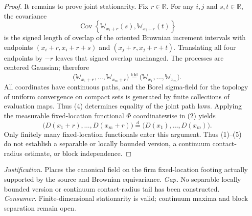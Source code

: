 \documentclass{article}
\begin{document}
\begin{proof}
It remains to prove joint stationarity.  Fix \(r\in\mathbb R\).  For any \(i,j\) and \(s,t\in\mathbb R\), the covariance
\[
 \operatorname{Cov}\!\left\{\mathbb W_{x_i+r}(s),\mathbb W_{x_j+r}(t)\right\}
\]
is the signed length of overlap of the oriented Brownian increment intervals with endpoints \((x_i+r,x_i+r+s)\) and \((x_j+r,x_j+r+t)\).  Translating all four endpoints by \(-r\) leaves that signed overlap unchanged.  The processes are centered Gaussian; therefore
\[
 \bigl(\mathbb W_{x_1+r},\ldots,\mathbb W_{x_m+r}\bigr)
 \stackrel{\mathrm{fdd}}{=}
 \bigl(\mathbb W_{x_1},\ldots,\mathbb W_{x_m}\bigr). \tag{4}
\]
All coordinates have continuous paths, and the Borel sigma-field for the topology of uniform convergence on compact sets is generated by finite collections of evaluation maps.  Thus (4) determines equality of the joint path laws.  Applying the measurable fixed-location functional \(\Phi\) coordinatewise in (2) yields
\[
 \bigl(D(x_1+r),\ldots,D(x_m+r)\bigr)
 \stackrel{d}{=}
 \bigl(D(x_1),\ldots,D(x_m)\bigr). \tag{5}
\]
Only finitely many fixed-location functionals enter this argument.  Thus (1)--(5) do not establish a separable or locally bounded version, a continuum contact-radius estimate, or block independence.
\end{proof}
\par\smallskip\noindent \textit{Justification.} Places the canonical field on the firm fixed-location footing actually supported by the source and Brownian equivariance. \textit{Gap.} No separable locally bounded version or continuum contact-radius tail has been constructed. \textit{Consumer.} Finite-dimensional stationarity is valid; continuum maxima and block separation remain open.
\end{document}
